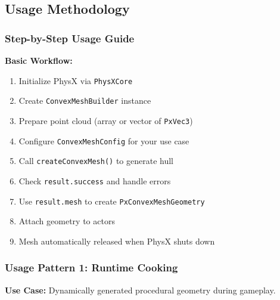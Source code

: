 
\subsection{Usage Methodology}

\subsubsection{Step-by-Step Usage Guide}

\textbf{Basic Workflow:}

\begin{enumerate}
    \item Initialize PhysX via \texttt{PhysXCore}
    \item Create \texttt{ConvexMeshBuilder} instance
    \item Prepare point cloud (array or vector of \texttt{PxVec3})
    \item Configure \texttt{ConvexMeshConfig} for your use case
    \item Call \texttt{createConvexMesh()} to generate hull
    \item Check \texttt{result.success} and handle errors
    \item Use \texttt{result.mesh} to create \texttt{PxConvexMeshGeometry}
    \item Attach geometry to actors
    \item Mesh automatically released when PhysX shuts down
\end{enumerate}

\subsubsection{Usage Pattern 1: Runtime Cooking}

\textbf{Use Case:} Dynamically generated procedural geometry during gameplay.

